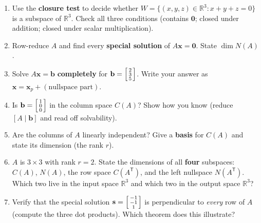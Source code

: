 \documentclass[10pt]{article}
\newcommand{\bb}{\mathbf{b}}
\newcommand{\xx}{\mathbf{x}}
\newcommand{\zero}{\mathbf{0}}
\newcommand{\svec}{\mathbf{s}}
\newcommand{\T}{^{\mathsf T}}
\begin{document}
\begin{enumerate}[leftmargin=1.9em, itemsep=13pt]
  \item Use the \textbf{closure test} to decide whether $W=\{(x,y,z)\in\mathbb{R}^3 : x+y+z=0\}$ is a
        subspace of $\mathbb{R}^3$. Check all three conditions (contains $\zero$; closed under addition;
        closed under scalar multiplication).
        \vspace{2.4cm}
  \item Row-reduce $A$ and find every \textbf{special solution} of $A\xx=\zero$. State $\dim N(A)$.
        \vspace{2.6cm}
  \item Solve $A\xx=\bb$ \textbf{completely} for $\bb=\begin{bsmallmatrix}2\\3\\5\end{bsmallmatrix}$.
        Write your answer as $\xx=\xx_p+(\text{nullspace part})$.
        \vspace{2.4cm}
  \item Is $\bb=\begin{bsmallmatrix}1\\0\\0\end{bsmallmatrix}$ in the column space $C(A)$? Show how you
        know (reduce $[A\mid\bb]$ and read off solvability).
        \vspace{2.4cm}
  \item Are the columns of $A$ linearly independent? Give a \textbf{basis} for $C(A)$ and state its
        dimension (the rank $r$).
        \vspace{2.2cm}
  \item $A$ is $3\times3$ with rank $r=2$. State the dimensions of all \textbf{four} subspaces:
        $C(A)$, $N(A)$, the row space $C(A\T)$, and the left nullspace $N(A\T)$. Which two live in the
        input space $\mathbb{R}^3$ and which two in the output space $\mathbb{R}^3$?
        \vspace{2.4cm}
  \item Verify that the special solution $\svec=\begin{bsmallmatrix}-1\\-1\\1\end{bsmallmatrix}$ is
        perpendicular to \emph{every} row of $A$ (compute the three dot products). Which theorem does
        this illustrate?
        \vspace{2.2cm}
\end{enumerate}
\end{document}
